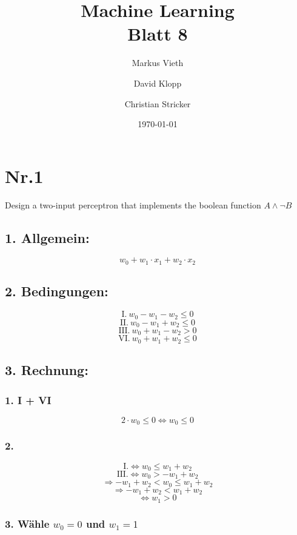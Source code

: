 \documentclass[a4paper,11pt,twoside]{scrartcl}
\title{Machine Learning\\ Blatt 8}
\author{Markus Vieth\and David Klopp\and Christian Stricker}
\date{\today}
\begin{document}
\newcommand{\cor}[1]{\textcolor{red}{\textit{#1}}}
\maketitle
\cleardoublepage
\pagestyle{myheadings}

\newpage

\section*{Nr.1}
Design a two-input perceptron that implements the boolean function $A \land \neg B$\\

\subsection*{1. Allgemein:} \[w_0 + w_1 \cdot x_1 + w_2 \cdot x_2\]

\subsection*{2. Bedingungen:}

\[\text{I.}~w_0 - w_1 - w_2 \leq 0 \]
\[\text{II.}~w_0 - w_1 + w_2 \leq 0 \]
\[\text{III.}~w_0 + w_1 - w_2 > 0 \]
\[\text{VI.}~w_0 + w_1 + w_2 \leq 0 \]

\subsection*{3. Rechnung:}

\subsubsection*{1. I + VI}
\[2 \cdot w_0 \leq 0 \Leftrightarrow w_0 \leq 0 \]

\subsubsection*{2.}
\[\text{I.} \Leftrightarrow w_0 \leq w_1 + w_2\]
\[\text{III.} \Leftrightarrow w_0 > -w_1 + w_2\]
\[\Rightarrow -w_1 + w_2 <  w_0 \leq w_1 + w_2\]
\[\Rightarrow -w_1 + w_2 < w_1 + w_2\]
\[ \Leftrightarrow w_1 > 0\]

\subsubsection*{3. Wähle $w_0 = 0$ und $w_1 = 1$}
\end{document}

